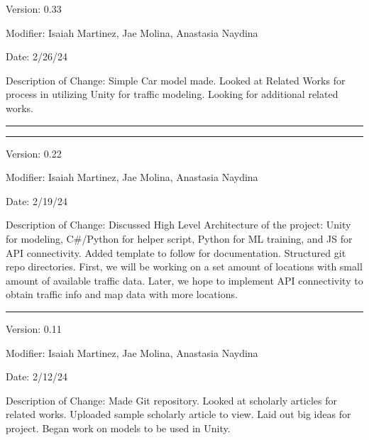 Version: 0.33

Modifier: Isaiah Martinez, Jae Molina, Anastasia Naydina

Date: 2/26/24

Description of Change: Simple Car model made. 
Looked at Related Works for process in utilizing Unity for traffic modeling.
Looking for additional related works.

\noindent\rule{12cm}{0.4pt}

\newpage

\noindent\rule{12cm}{0.4pt}

Version: 0.22

Modifier: Isaiah Martinez, Jae Molina, Anastasia Naydina

Date: 2/19/24

Description of Change: Discussed High Level Architecture of the project: Unity for modeling, C\#/Python for helper script, Python for ML training, and JS for API connectivity.
Added template to follow for documentation.
Structured git repo directories.
First, we will be working on a set amount of locations with small amount of available traffic data.
Later, we hope to implement API connectivity to obtain traffic info and map data with more locations.

\noindent\rule{12cm}{0.4pt}

Version: 0.11

Modifier: Isaiah Martinez, Jae Molina, Anastasia Naydina

Date: 2/12/24

Description of Change: Made Git repository. 
Looked at scholarly articles for related works.
Uploaded sample scholarly article to view.
Laid out big ideas for project.
Began work on models to be used in Unity.